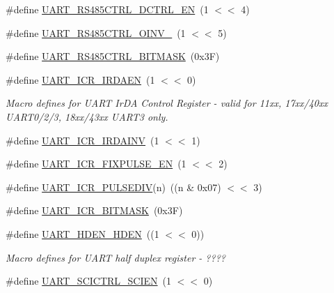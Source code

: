 \begin{DoxyCompactItemize}
\item 
\#define \hyperlink{group___u_a_r_t__18_x_x__43_x_x_gaa00bb66207fce982ed0dbd6325d8fb66}{U\+A\+R\+T\+\_\+\+R\+S485\+C\+T\+R\+L\+\_\+\+D\+C\+T\+R\+L\+\_\+\+EN}~(1 $<$$<$ 4)
\item 
\#define \hyperlink{group___u_a_r_t__18_x_x__43_x_x_gaadf3ec8419a76ba6c3ccd2a4eb9b233b}{U\+A\+R\+T\+\_\+\+R\+S485\+C\+T\+R\+L\+\_\+\+O\+I\+N\+V\+\_}~(1 $<$$<$ 5)
\item 
\#define \hyperlink{group___u_a_r_t__18_x_x__43_x_x_ga4ab3c90d083989134e4881e0b82e7364}{U\+A\+R\+T\+\_\+\+R\+S485\+C\+T\+R\+L\+\_\+\+B\+I\+T\+M\+A\+SK}~(0x3\+F)
\item 
\#define \hyperlink{group___u_a_r_t__18_x_x__43_x_x_ga716e4830450b44e4f290e6c99879ba99}{U\+A\+R\+T\+\_\+\+I\+C\+R\+\_\+\+I\+R\+D\+A\+EN}~(1 $<$$<$ 0)
\begin{DoxyCompactList}\small\item\em Macro defines for U\+A\+RT Ir\+DA Control Register -\/ valid for 11xx, 17xx/40xx U\+A\+R\+T0/2/3, 18xx/43xx U\+A\+R\+T3 only. \end{DoxyCompactList}\item 
\#define \hyperlink{group___u_a_r_t__18_x_x__43_x_x_gabee5ba619dd3c8f28a7d2ec488614f06}{U\+A\+R\+T\+\_\+\+I\+C\+R\+\_\+\+I\+R\+D\+A\+I\+NV}~(1 $<$$<$ 1)
\item 
\#define \hyperlink{group___u_a_r_t__18_x_x__43_x_x_gae022dc3e5ad94f95d2805294d97594cd}{U\+A\+R\+T\+\_\+\+I\+C\+R\+\_\+\+F\+I\+X\+P\+U\+L\+S\+E\+\_\+\+EN}~(1 $<$$<$ 2)
\item 
\#define \hyperlink{group___u_a_r_t__18_x_x__43_x_x_ga2c4fd2b4e5050b400349138942bfb307}{U\+A\+R\+T\+\_\+\+I\+C\+R\+\_\+\+P\+U\+L\+S\+E\+D\+IV}(n)~((n \& 0x07) $<$$<$ 3)
\item 
\#define \hyperlink{group___u_a_r_t__18_x_x__43_x_x_ga822d618fad4a8a146fd8113f827b5d09}{U\+A\+R\+T\+\_\+\+I\+C\+R\+\_\+\+B\+I\+T\+M\+A\+SK}~(0x3\+F)
\item 
\#define \hyperlink{group___u_a_r_t__18_x_x__43_x_x_ga3affaa6bd622295bd6ea0c9f4a70b19c}{U\+A\+R\+T\+\_\+\+H\+D\+E\+N\+\_\+\+H\+D\+EN}~((1 $<$$<$ 0))
\begin{DoxyCompactList}\small\item\em Macro defines for U\+A\+RT half duplex register -\/ ???? \end{DoxyCompactList}\item 
\#define \hyperlink{group___u_a_r_t__18_x_x__43_x_x_gac14d3bf09ef0b0956626afe3e0fcf83a}{U\+A\+R\+T\+\_\+\+S\+C\+I\+C\+T\+R\+L\+\_\+\+S\+C\+I\+EN}~(1 $<$$<$ 0)

\end{DoxyCompactItemize}
